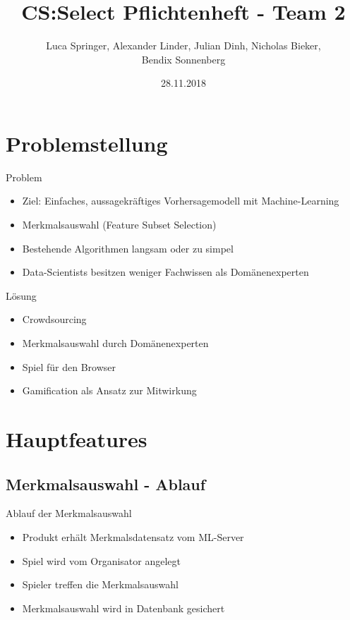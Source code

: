 \documentclass[xcolor=dvipsnames]{beamer}
\title[Team 2 - Pflichtenheft]{CS:Select Pflichtenheft - Team 2}
\author{Luca Springer, Alexander Linder, Julian Dinh, Nicholas Bieker,\\ Bendix Sonnenberg}
\date{28.11.2018}
\begin{document}
\begin{frame} %
  \titlepage
\end{frame}
\section{Problemstellung}
\begin{frame}{Problem}
    \begin{itemize}
        \item Ziel: Einfaches, aussagekräftiges Vorhersagemodell mit Machine-Learning \\
        \item Merkmalsauswahl (Feature Subset Selection) \\
        \item Bestehende Algorithmen langsam oder zu simpel \\
        \item Data-Scientists besitzen weniger Fachwissen als Domänenexperten \\
    \end{itemize}
\end{frame}
\begin{frame}{Lösung}
    \begin{itemize}
        \item Crowdsourcing \\
        \item Merkmalsauswahl durch Domänenexperten \\
        \item Spiel für den Browser \\
        \item Gamification als Ansatz zur Mitwirkung \\
    \end{itemize}
\end{frame}
\section{Hauptfeatures}
\subsection{Merkmalsauswahl - Ablauf}
\begin{frame}
    \begin{block}{Ablauf der Merkmalsauswahl}
        \begin{itemize}
            \item Produkt erhält Merkmalsdatensatz vom ML-Server
            \item Spiel wird vom Organisator angelegt
            \item Spieler treffen die Merkmalsauswahl
            \item Merkmalsauswahl wird in Datenbank gesichert
        \end{itemize}
    \end{block}
\end{frame}
\end{document}
